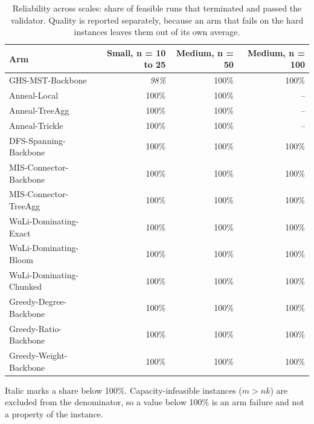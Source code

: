 \begin{table}[tb]
\centering
\caption{Reliability across scales: share of feasible runs that terminated and passed the validator. Quality is reported separately, because an arm that fails on the hard instances leaves them out of its own average.}
\label{tab:reliability}
\begin{tabular}{lrrr}
\toprule
Arm & Small, n = 10 to 25 & Medium, n = 50 & Medium, n = 100 \\
\midrule
GHS-MST-Backbone & \textit{98\%} & 100\% & 100\% \\
Anneal-Local & 100\% & 100\% & -- \\
Anneal-TreeAgg & 100\% & 100\% & -- \\
Anneal-Trickle & 100\% & 100\% & -- \\
DFS-Spanning-Backbone & 100\% & 100\% & 100\% \\
MIS-Connector-Backbone & 100\% & 100\% & 100\% \\
MIS-Connector-TreeAgg & 100\% & 100\% & 100\% \\
WuLi-Dominating-Exact & 100\% & 100\% & 100\% \\
WuLi-Dominating-Bloom & 100\% & 100\% & 100\% \\
WuLi-Dominating-Chunked & 100\% & 100\% & 100\% \\
Greedy-Degree-Backbone & 100\% & 100\% & 100\% \\
Greedy-Ratio-Backbone & 100\% & 100\% & 100\% \\
Greedy-Weight-Backbone & 100\% & 100\% & 100\% \\
\bottomrule
\end{tabular}
\begin{flushleft}\footnotesize
Italic marks a share below 100\%. Capacity-infeasible instances ($m > nk$) are excluded from the denominator, so a value below 100\% is an arm failure and not a property of the instance.
\end{flushleft}
\end{table}
